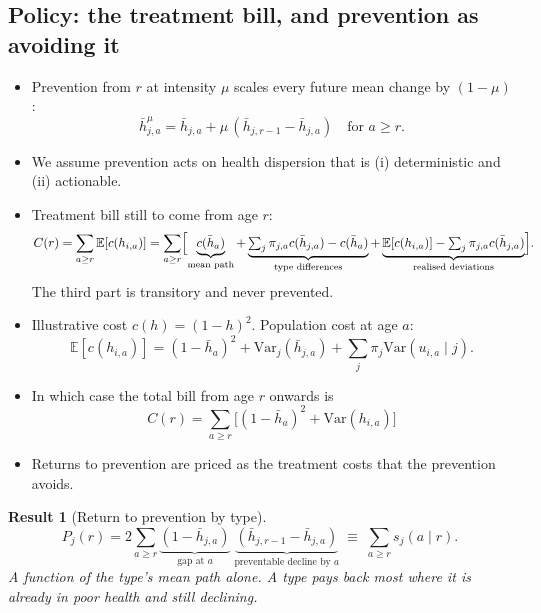 \documentclass[11pt]{article}
\newtheorem{result}{Result}
\newcommand{\E}{\mathbb{E}}
\newcommand{\Var}{\mathrm{Var}}
\begin{document}
\subsection{Policy: the treatment bill, and prevention as avoiding it}
\label{sec:policy_fw}
\begin{itemize}
	\item Prevention from $r$ at intensity $\mu$ scales every future mean change by $(1-\mu)$:
	$$
	\bar h^{\mu}_{j,a}=\bar h_{j,a}+\mu\,(\bar h_{j,r-1}-\bar h_{j,a})\quad\text{for } a\ge r .
	$$
	\item We assume prevention acts on health dispersion that is (i) deterministic and (ii) actionable. 
	\item Treatment bill still to come from age $r$:
	\begin{equation}
		C(r)=\sum_{a\ge r}\E[c(h_{i,a})]=\sum_{a\ge r}\Bigl[\underbrace{c(\bar h_a)}_{\text{mean path}}+\underbrace{\textstyle\sum_j\pi_{j,a}c(\bar h_{j,a})-c(\bar h_a)}_{\text{type differences}}+\underbrace{\E[c(h_{i,a})]-\textstyle\sum_j\pi_{j,a}c(\bar h_{j,a})}_{\text{realised deviations}}\Bigr].
		\label{eq:C}
	\end{equation}
	The third part is transitory and never prevented.
	\item Illustrative cost $c(h)=(1-h)^2$. Population cost at age $a$:
	\begin{equation}
		\E[c(h_{i,a})]=(1-\bar h_a)^2+\Var_j(\bar h_{j,a})+\textstyle\sum_j\pi_j\Var(u_{i,a}\mid j).
		\label{eq:popcost}
	\end{equation}
	\item In which case the total bill from age $r$ onwards is 
	\begin{equation}
		C(r)=\sum_{a\ge r}\bigl[(1-\bar h_a)^2+\Var(h_{i,a})\bigr]
	\end{equation}
	\item Returns to prevention are priced as the treatment costs that the prevention avoids. 
\end{itemize}


\begin{result}[Return to prevention by type]\label{res:prev}
	\begin{equation}
		P_j(r)=2\sum_{a\ge r}\underbrace{(1-\bar h_{j,a})}_{\text{gap at }a}\;\underbrace{(\bar h_{j,r-1}-\bar h_{j,a})}_{\text{preventable decline by }a}\;\equiv\;\sum_{a\ge r}s_j(a\mid r).
		\label{eq:Pj}
	\end{equation}
	A function of the type's mean path alone. A type pays back most where it is already in poor health and still declining.
\end{result}
\end{document}
